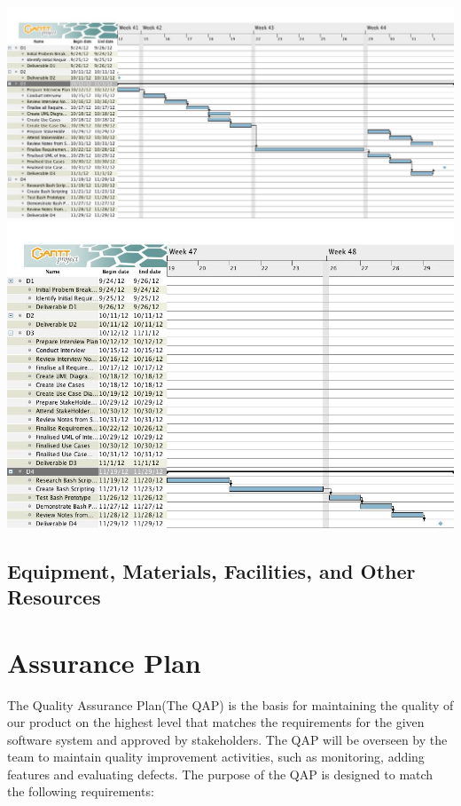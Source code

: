 \documentclass{l3deliverable}
\begin{document}
{\includegraphics[scale=0.3]{img/GANTTD3.jpg}\\
\includegraphics[scale=0.5]{img/GANTTD4.jpg}\\




\subsection{Equipment, Materials, Facilities, and Other Resources}


\section{Assurance Plan}


The Quality Assurance Plan(The QAP) is the basis for maintaining the quality of our product on the highest level that matches the requirements for the given software system and approved by stakeholders. The QAP will be overseen by the team to maintain quality improvement activities, such as monitoring, adding features and evaluating defects. The purpose of the QAP is designed to match the following requirements:\\

}
\end{document}
